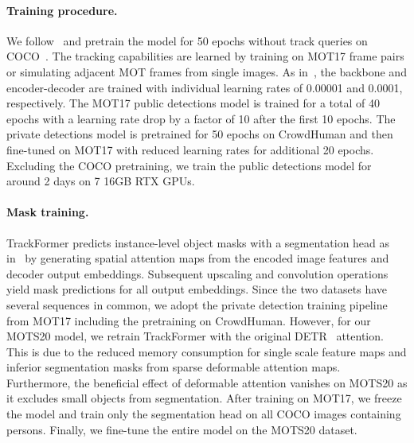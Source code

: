 \documentclass[10pt,twocolumn,letterpaper]{article}
\begin{document}
\paragraph{Training procedure.}
We follow~\cite{deformable_detr} and pretrain the model for 50 epochs without track queries on COCO~\cite{COCO}.
The tracking capabilities are learned by training on MOT17 frame pairs or simulating adjacent MOT frames from single images.
As in~\cite{deformable_detr}, the backbone and encoder-decoder are trained with individual learning rates of 0.00001 and 0.0001, respectively.
The MOT17 public detections model is trained for a total of 40 epochs with a learning rate drop by a factor of 10 after the first 10 epochs.
The private detections model is pretrained for 50 epochs on CrowdHuman and then fine-tuned on MOT17 with reduced learning rates for additional 20 epochs.
Excluding the COCO pretraining, we train the public detections model for around 2 days on 7 16GB RTX GPUs.

\paragraph{Mask training.}
TrackFormer predicts instance-level object masks with a segmentation head as in~\cite{DETR} by generating spatial attention maps from the encoded image features and decoder output embeddings.
Subsequent upscaling and convolution operations yield mask predictions for all output embeddings.
Since the two datasets have several sequences in common, we adopt the private detection training pipeline from MOT17 including the pretraining on CrowdHuman.
However, for our MOTS20 model, we retrain TrackFormer with the original DETR~\cite{DETR} attention.
This is due to the reduced memory consumption for single scale feature maps and inferior segmentation masks from sparse deformable attention maps.
Furthermore, the beneficial effect of deformable attention vanishes on MOTS20 as it excludes small objects from segmentation.
After training on MOT17, we freeze the model and train only the segmentation head on all COCO images containing persons.
Finally, we fine-tune the entire model on the MOTS20 dataset.
\end{document}
